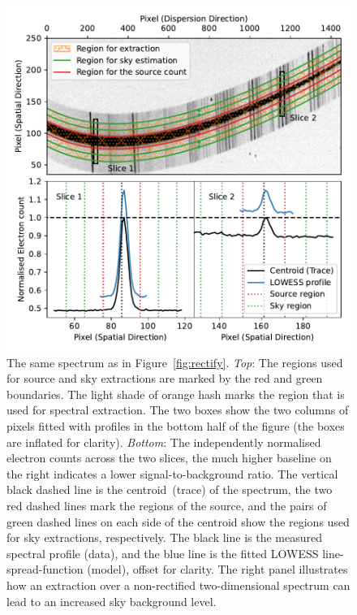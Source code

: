 \documentclass[linenumbers, twocolumn]{aastex631}
\begin{document}
\begin{figure}
    \centering
    \includegraphics[width=\columnwidth]{fig_03_extraction_profile.pdf}
    \caption{The same spectrum as in Figure~\ref{fig:rectify}. \textit{Top}:
    The regions used for source and sky extractions are marked
    by the red and green boundaries. The light shade of orange
    hash marks the region that is used for spectral extraction.
    The two boxes show the two columns of pixels fitted with
    profiles in the bottom half of the figure (the boxes are inflated
    for clarity). \textit{Bottom}: The independently normalised electron
    counts across the two slices, the much higher baseline on the right indicates a lower signal-to-background ratio. The vertical black dashed
    line is the centroid~(trace) of the spectrum, the two red dashed lines
    mark the regions of the source, and the pairs of green dashed lines on
    each side of the centroid show the regions used for sky extractions,
    respectively. The black line is the measured spectral profile (data), and
    the blue line is the fitted LOWESS line-spread-function (model), offset for
    clarity. The right panel illustrates how an extraction over a non-rectified
    two-dimensional spectrum can lead to an increased sky background level.}
    \label{fig:extraction}
\end{figure}
\end{document}
